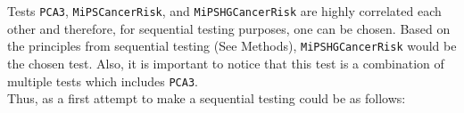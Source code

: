 \documentclass[]{article}
\begin{document}
\begin{minipage}{\linewidth}
\label{fig:pairs}
\end{minipage} \\
\\
\noindent Tests {\verb|PCA3|}, {\verb|MiPSCancerRisk|}, and {\verb|MiPSHGCancerRisk|} 
are highly correlated each other and therefore, for sequential testing purposes, one can be chosen. 
Based on the principles from sequential testing (See Methods), {\verb|MiPSHGCancerRisk|} would be the 
chosen test. Also, it is important to notice that this test is a  combination of multiple tests which includes 
\verb|PCA3|.  \\

\noindent Thus, as a first attempt to make a sequential testing could be as follows: \\

% 

%  
%  
%  
\end{document}
